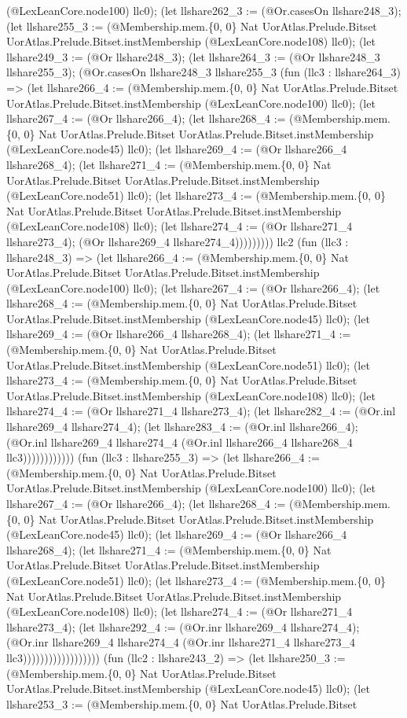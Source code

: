 \documentclass[11pt]{article}
\begin{document}
(@LexLeanCore.node100) llc0); (let llshare262\_3 := (@Or.casesOn llshare248\_3); (let llshare255\_3 := (@Membership.mem.\{0, 0\} Nat UorAtlas.Prelude.Bitset UorAtlas.Prelude.Bitset.instMembership (@LexLeanCore.node108) llc0); (let llshare249\_3 := (@Or llshare248\_3); (let llshare264\_3 := (@Or llshare248\_3 llshare255\_3); (@Or.casesOn llshare248\_3 llshare255\_3 (fun (llc3 : llshare264\_3) => (let llshare266\_4 := (@Membership.mem.\{0, 0\} Nat UorAtlas.Prelude.Bitset UorAtlas.Prelude.Bitset.instMembership (@LexLeanCore.node100) llc0); (let llshare267\_4 := (@Or llshare266\_4); (let llshare268\_4 := (@Membership.mem.\{0, 0\} Nat UorAtlas.Prelude.Bitset UorAtlas.Prelude.Bitset.instMembership (@LexLeanCore.node45) llc0); (let llshare269\_4 := (@Or llshare266\_4 llshare268\_4); (let llshare271\_4 := (@Membership.mem.\{0, 0\} Nat UorAtlas.Prelude.Bitset UorAtlas.Prelude.Bitset.instMembership (@LexLeanCore.node51) llc0); (let llshare273\_4 := (@Membership.mem.\{0, 0\} Nat UorAtlas.Prelude.Bitset UorAtlas.Prelude.Bitset.instMembership (@LexLeanCore.node108) llc0); (let llshare274\_4 := (@Or llshare271\_4 llshare273\_4); (@Or llshare269\_4 llshare274\_4))))))))) llc2 (fun (llc3 : llshare248\_3) => (let llshare266\_4 := (@Membership.mem.\{0, 0\} Nat UorAtlas.Prelude.Bitset UorAtlas.Prelude.Bitset.instMembership (@LexLeanCore.node100) llc0); (let llshare267\_4 := (@Or llshare266\_4); (let llshare268\_4 := (@Membership.mem.\{0, 0\} Nat UorAtlas.Prelude.Bitset UorAtlas.Prelude.Bitset.instMembership (@LexLeanCore.node45) llc0); (let llshare269\_4 := (@Or llshare266\_4 llshare268\_4); (let llshare271\_4 := (@Membership.mem.\{0, 0\} Nat UorAtlas.Prelude.Bitset UorAtlas.Prelude.Bitset.instMembership (@LexLeanCore.node51) llc0); (let llshare273\_4 := (@Membership.mem.\{0, 0\} Nat UorAtlas.Prelude.Bitset UorAtlas.Prelude.Bitset.instMembership (@LexLeanCore.node108) llc0); (let llshare274\_4 := (@Or llshare271\_4 llshare273\_4); (let llshare282\_4 := (@Or.inl llshare269\_4 llshare274\_4); (let llshare283\_4 := (@Or.inl llshare266\_4); (@Or.inl llshare269\_4 llshare274\_4 (@Or.inl llshare266\_4 llshare268\_4 llc3)))))))))))) (fun (llc3 : llshare255\_3) => (let llshare266\_4 := (@Membership.mem.\{0, 0\} Nat UorAtlas.Prelude.Bitset UorAtlas.Prelude.Bitset.instMembership (@LexLeanCore.node100) llc0); (let llshare267\_4 := (@Or llshare266\_4); (let llshare268\_4 := (@Membership.mem.\{0, 0\} Nat UorAtlas.Prelude.Bitset UorAtlas.Prelude.Bitset.instMembership (@LexLeanCore.node45) llc0); (let llshare269\_4 := (@Or llshare266\_4 llshare268\_4); (let llshare271\_4 := (@Membership.mem.\{0, 0\} Nat UorAtlas.Prelude.Bitset UorAtlas.Prelude.Bitset.instMembership (@LexLeanCore.node51) llc0); (let llshare273\_4 := (@Membership.mem.\{0, 0\} Nat UorAtlas.Prelude.Bitset UorAtlas.Prelude.Bitset.instMembership (@LexLeanCore.node108) llc0); (let llshare274\_4 := (@Or llshare271\_4 llshare273\_4); (let llshare292\_4 := (@Or.inr llshare269\_4 llshare274\_4); (@Or.inr llshare269\_4 llshare274\_4 (@Or.inr llshare271\_4 llshare273\_4 llc3)))))))))))))))))) (fun (llc2 : llshare243\_2) => (let llshare250\_3 := (@Membership.mem.\{0, 0\} Nat UorAtlas.Prelude.Bitset UorAtlas.Prelude.Bitset.instMembership (@LexLeanCore.node45) llc0); (let llshare253\_3 := (@Membership.mem.\{0, 0\} Nat UorAtlas.Prelude.Bitset 
\end{document}
